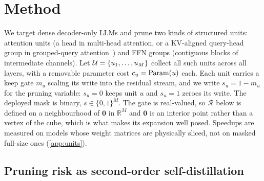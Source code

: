 \section{Method}
\label{sec:method}

We target dense decoder-only LLMs and prune two kinds of structured units: attention units
(a head in multi-head attention, or a KV-aligned query-head group in grouped-query
attention~\citep{ainslie2023gqa}) and FFN groups (contiguous blocks of intermediate
channels). Let $\mathcal{U}=\{u_1,\dots,u_M\}$ collect all such units across all layers, with a removable
parameter cost $c_u=\operatorname{Param}(u)$ each. Each unit carries a keep gate $m_u$ scaling its write into the residual stream, and we write
$s_u=1-m_u$ for the pruning variable: $s_u{=}0$ keeps unit $u$ and $s_u{=}1$ zeroes its write. The
deployed mask is binary, $s\in\{0,1\}^M$. The gate is real-valued, so $\mathcal{R}$ below is defined on
a neighbourhood of $\mathbf 0$ in $\mathbb{R}^M$ and $\mathbf 0$ is an interior point rather than a
vertex of the cube, which is what makes its expansion well posed. Speedups are measured on models whose weight matrices are
physically sliced, not on masked full-size ones (\cref{app:units}).

\subsection{Pruning risk as second-order self-distillation}
\label{sec:method-risk}

